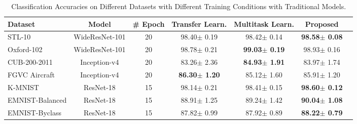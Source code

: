 \documentclass{article}
\begin{document}
\begin{table*}[t]
\caption{Classification Accuracies on Different Datasets with Different Training Conditions with Traditional Models.}
\label{Tclass}
\vskip 0.15in
\begin{center}
\begin{small}
\begin{sc}
\begin{tabular}{lcccccr}
\toprule
Dataset & Model & \# Epoch & Transfer Learn. & Multitask Learn. & Proposed \\
\midrule  
STL-10  &WideResNet-101 &20& 98.40$\pm$ 0.19& 98.42$\pm$ 0.14 & \bf{98.58$\pm$ 0.08} \\
Oxford-102 &WideResNet-101 &20& 98.78$\pm$ 0.21& \bf{99.03$\pm$ 0.19} & 98.93$\pm$ 0.16 \\
CUB-200-2011 &Inception-v4 &20& 83.26$\pm$ 2.36& \bf{84.93$\pm$ 1.91}& 83.97$\pm$ 1.74 \\
FGVC Aircraft &Inception-v4 &20& \bf{86.30$\pm$ 1.20}& 85.12$\pm$ 1.60& 85.91$\pm$ 1.20\\
K-MNIST  &ResNet-18  &15& 98.14$\pm$ 0.21& 98.41$\pm$ 0.15& \bf{98.60$\pm$ 0.12} \\
EMNIST-Balanced &ResNet-18 &15& 88.91$\pm$ 1.25& 89.24$\pm$ 1.42& \bf{90.04$\pm$ 1.08} \\
EMNIST-Byclass &ResNet-18 &15& 87.82$\pm$ 0.99& 87.92$\pm$ 0.89& \bf{88.22$\pm$ 0.79} \\


\bottomrule
\end{tabular}
\end{sc}
\end{small}
\end{center}
\vskip -0.1in
\end{table*}
\end{document}
